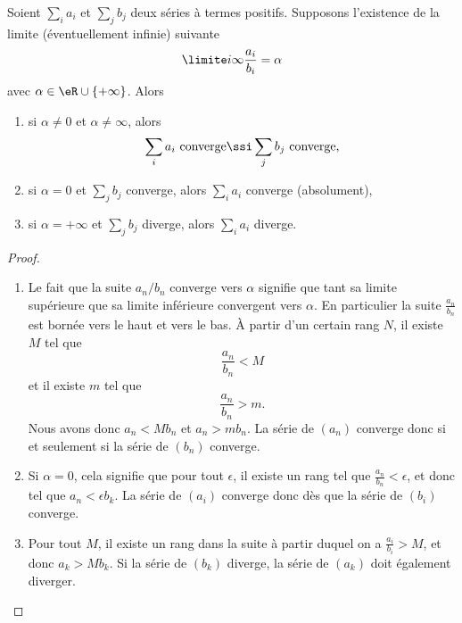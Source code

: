 \begin{proposition}     \label{PROPooEEACooOYmtxd}
	Soient \( \sum_i a_i\) et \( \sum_j b_j\) deux séries à termes positifs. Supposons l'existence de la limite (éventuellement infinie) suivante
	\begin{equation}
		\limite i \infty \frac{a_i}{b_i} = \alpha
	\end{equation}
	avec \( \alpha\in \eR\cup\{ +\infty \}\). Alors
	\begin{enumerate}
		\item si \( \alpha \neq 0\) et \( \alpha\neq \infty\), alors
		      \begin{equation}
			      \sum_i a_i \text{~converge} \ssi \sum_j b_j\text{~converge,}
		      \end{equation}
		\item si \( \alpha = 0\) et \( \sum_j b_j\) converge, alors \( \sum_i a_i\) converge (absolument),
		\item si \( \alpha = +\infty\) et \( \sum_j b_j\) diverge, alors \( \sum_i a_i\) diverge.
	\end{enumerate}
\end{proposition}

\begin{proof}
	\begin{enumerate}
		\item
		      Le fait que la suite \( a_n/b_n\) converge vers \( \alpha\) signifie que tant sa limite supérieure que sa limite inférieure convergent vers \( \alpha\). En particulier la suite \( \frac{ a_n }{ b_n }\) est bornée vers le haut et vers le bas. À partir d'un certain rang \( N\), il existe \( M\) tel que
		      \begin{equation}
			      \frac{ a_n }{ b_n }<M
		      \end{equation}
		      et il existe \( m\) tel que
		      \begin{equation}
			      \frac{ a_n }{ b_n }>m.
		      \end{equation}
		      Nous avons donc \( a_n<Mb_n\) et \( a_n>mb_n\). La série de \( (a_n)\) converge donc si et seulement si la série de \( (b_n)\) converge.
		\item
		      Si \( \alpha=0\), cela signifie que pour tout \( \epsilon\), il existe un rang tel que \( \frac{ a_n }{ b_n }<\epsilon\), et donc tel que \( a_n<\epsilon b_k\). La série de \( (a_i)\) converge donc dès que la série de \( (b_i)\) converge.
		\item
		      Pour tout \( M\), il existe un rang dans la suite à partir duquel on a \( \frac{ a_i }{ b_i }>M\), et donc \( a_k>Mb_k\). Si la série de \( (b_k)\) diverge, la série de \( (a_k)\) doit également diverger.
	\end{enumerate}
\end{proof}

